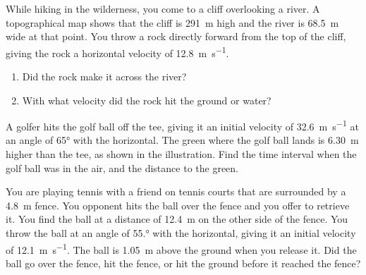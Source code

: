 \begin{example}
  While hiking in the wilderness, you come to a cliff
  overlooking a river. A topographical map shows that the cliff is
  \SI{291}{\metre} high and the river is \SI{68.5}{\metre} wide at that
  point. You throw a rock directly forward from the top of the cliff, giving
  the rock a horizontal velocity of \SI{12.8}{\metre\per\second}.
  \begin{enumerate}
  \item Did the rock make it across the river?
  \item With what velocity did the rock hit the ground or water?
  \end{enumerate}
  
  \begin{center}
  \end{center}
\end{example}



\begin{example}
  A golfer hits the golf ball off the tee, giving it an
  initial velocity of \SI{32.6}{\metre\per\second} at an angle of \ang{65} with
  the horizontal. The green where the golf ball lands is \SI{6.30}{\metre}
  higher than the tee, as shown in the illustration. Find the time interval
  when the golf ball was in the air, and the distance to the green.
  \begin{center}
  \end{center}
\end{example}



\begin{example}
  You are playing tennis with a friend on tennis courts
  that are surrounded by a \SI{4.8}{\metre} fence. You opponent hits the ball
  over the fence and you offer to retrieve it. You find the ball at a distance
  of \SI{12.4}{\metre} on the other side of the fence. You throw the ball at an
  angle of \ang{55.} with the horizontal, giving it an initial velocity of
  \SI{12.1}{\metre\per\second}. The ball is \SI{1.05}{\metre} above the ground
  when you release it. Did the ball go over the fence, hit the fence, or hit
  the ground before it reached the fence?
\end{example}



